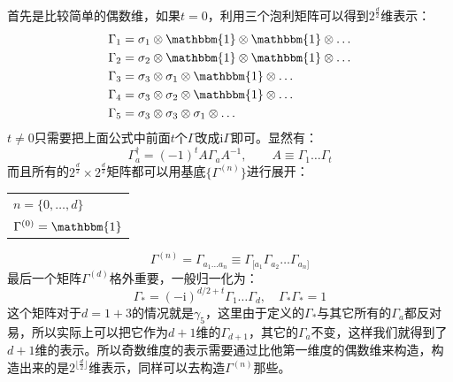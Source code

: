 首先是比较简单的偶数维，如果$t=0$，利用三个泡利矩阵可以得到$2^{\frac{d}{2}}$维表示：
\begin{equation}
	\begin{aligned}
		\Gamma_1& =\sigma_1\otimes\mathbbm{1}\otimes\mathbbm{1}\otimes\ldots   \\
		\Gamma_{2}& =\sigma_2\otimes\mathbbm{1}\otimes\mathbbm{1}\otimes\ldots   \\
		\Gamma_{3}& =\sigma_3\otimes\sigma_1\otimes\mathbbm{1}\otimes\ldots   \\
		\Gamma_{4}& =\sigma_3\otimes\sigma_2\otimes\mathbbm{1}\otimes\ldots   \\
		\Gamma_{5}& =\sigma_3\otimes\sigma_3\otimes\sigma_1\otimes\ldots   \\
	\end{aligned}
\end{equation}
$t\neq 0$只需要把上面公式中前面$t$个$\Gamma$改成$\mathrm{i}\Gamma$即可。显然有：
\begin{equation}
	\Gamma_a^\dagger=(-1)^tA\Gamma_aA^{-1},\quad\quad A\equiv\Gamma_1\ldots\Gamma_t
\end{equation}
而且所有的$2^{\frac{d}{2}}\times 2^{\frac{d}{2}}$矩阵都可以用基底$\{\Gamma^{(n)}\}$进行展开：\begin{margintable}\footnotesize 
	\begin{tabularx}{\marginparwidth}{|X}
		$n=\{0,\ldots,d\}$\\
		$\Gamma^{(0)}=\mathbbm{1}$
	\end{tabularx}
\end{margintable}
\begin{equation}
	\Gamma^{(n)}=\Gamma_{a_1...a_n}\equiv\Gamma_{[a_1}\Gamma_{a_2}\ldots\Gamma_{a_n]}
\end{equation}
最后一个矩阵$\Gamma^{(d)}$格外重要，一般归一化为：
\begin{equation}
	\Gamma_*=(-\mathrm{i})^{d/2+t}\Gamma_1\ldots\Gamma_d,\quad\Gamma_*\Gamma_*=1
\end{equation}
这个矩阵对于$d=1+3$的情况就是$\gamma_5$，这里由于定义的$\Gamma_*$与其它所有的$\Gamma_a$都反对易，所以实际上可以把它作为$d+1$维的$\Gamma_{d+1}$，其它的$\Gamma_a$不变，这样我们就得到了$d+1$维的表示。所以奇数维度的表示需要通过比他第一维度的偶数维来构造，构造出来的是$2^{\lfloor\frac{d}{2}\rfloor}$维表示，同样可以去构造$\Gamma^{(n)}$那些。

